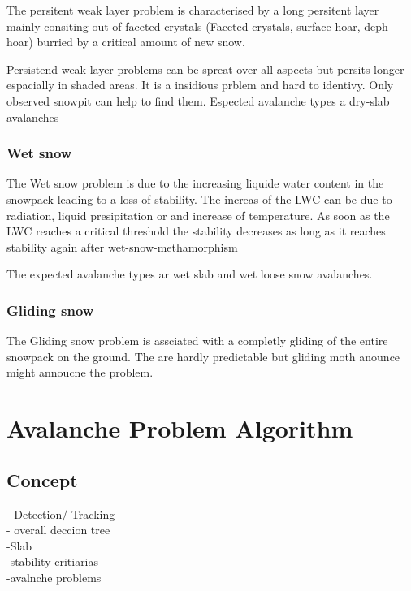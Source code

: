 The persitent weak layer problem is characterised by a long persitent layer mainly consiting out of faceted crystals
(Faceted crystals, surface hoar, deph hoar) burried by a critical amount of new snow.

Persistend weak layer problems can be spreat over all aspects but persits longer espacially in shaded areas. It is a
insidious prblem and hard to identivy. Only observed snowpit can help to find them. Espected avalanche types a dry-slab avalanches


\subsubsection{Wet snow}

The Wet snow problem is due to the increasing liquide water content in the snowpack leading to a loss of stability.
The increas of the LWC can be due to radiation, liquid presipitation or and increase of temperature. As soon as the LWC 
reaches a critical threshold the stability decreases as long as it reaches stability again after wet-snow-methamorphism

The expected avalanche types ar wet slab and wet loose snow avalanches.

\subsubsection{Gliding snow}

The Gliding snow problem is assciated with a completly gliding of the entire snowpack on the ground. The are hardly 
predictable but  gliding moth anounce might annoucne the problem.


\section{Avalanche Problem Algorithm}

\subsection{Concept}

- Detection/ Tracking\\
- overall deccion tree\\
-Slab \\
-stability critiarias\\
-avalnche problems




